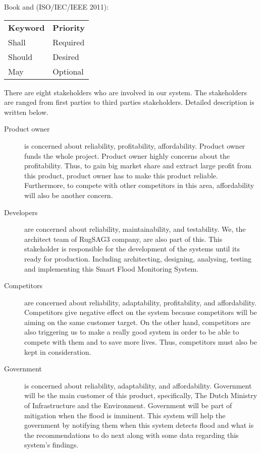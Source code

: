 Book and (ISO/IEC/IEEE 2011):\\
\begin{tabular}{|L{}|L{}|}
\toprule
\textbf{Keyword} & \textbf{Priority} \\
Shall & Required \\
Should & Desired \\
May & Optional \\
\bottomrule
\end{tabular}

There are eight stakeholders who are involved in our system. The stakeholders are ranged from first parties to third parties stakeholders. Detailed description is written below.

\begin{description}
\item[Product owner] is concerned about reliability, profitability, affordability. Product owner funds the whole project. Product owner highly concerns about the profitability. Thus, to gain big market share and extract large profit from this product, product owner has to make this product reliable. Furthermore, to compete with other competitors in this area, affordability will also be another concern.
\item[Developers] are concerned about reliability, maintainability, and testability. We, the architect team of RugSAG3 company, are also part of this. This stakeholder is responsible for the development of the systems until its ready for production. Including architecting, designing, analysing, testing and implementing this Smart Flood Monitoring System.
\item[Competitors] are concerned about reliability, adaptability, profitability, and affordability. Competitors give negative effect on the system because competitors will be aiming on the same customer target. On the other hand, competitors are also triggering us to make a really good system in order to be able to compete with them and to save more lives. Thus, competitors must also be kept in consideration.
\item[Government] is concerned about reliability, adaptability, and affordability. Government will be the main customer of this product, specifically, The Dutch Ministry of Infrastructure and the Environment. Government will be part of mitigation when the flood is imminent. This system will help the government by notifying them when this system detects flood and what is the recommendations to do next along with some data regarding this system's findings.

\end{description}
